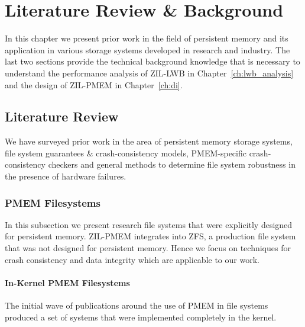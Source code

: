 \documentclass[12pt,a4paper,twoside,draft]{book}
\begin{document}

\chapter{Literature Review \& Background}
In this chapter we present prior work in the field of persistent memory and its application in various storage systems developed in research and industry.
The last two sections provide the technical background knowledge that is necessary to understand the performance analysis of ZIL-LWB in Chapter~\ref{ch:lwb_analysis} and the design of ZIL-PMEM in Chapter~\ref{ch:di}.

\section{Literature Review}
We have surveyed prior work in the area of persistent memory storage systems, file system guarantees \& crash-consistency models, PMEM-specific crash-consistency checkers and general methods to determine file system robustness in the presence of hardware failures.

\subsection{PMEM Filesystems}
In this subsection we present research file systems that were explicitly designed for persistent memory.
ZIL-PMEM integrates into ZFS, a production file system that was not designed for persistent memory.
Hence we focus on techniques for crash consistency and data integrity which are applicable to our work.

\subsubsection{In-Kernel PMEM Filesystems}\label{sec:in_kernel_pmem_filesystems}
The initial wave of publications around the use of PMEM in file systems produced a set of systems that were implemented completely in the kernel.
\end{document}
